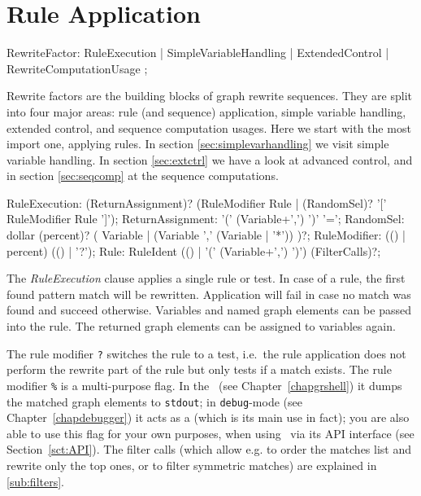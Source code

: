 \section{Rule Application} \label{sec:ruleapplication}

\begin{rail} 
  RewriteFactor: RuleExecution
     | SimpleVariableHandling
     | ExtendedControl
     | RewriteComputationUsage
	; 
\end{rail}

Rewrite factors are the building blocks of graph rewrite sequences.
They are split into four major areas: rule (and sequence) application, simple variable handling, extended control, and sequence computation usages.
Here we start with the most import one, applying rules.
In section \ref{sec:simplevarhandling} we visit simple variable handling.
In section \ref{sec:extctrl} we have a look at advanced control, and in section \ref{sec:seqcomp} at the sequence computations.

\begin{rail}
  RuleExecution: (ReturnAssignment)? (RuleModifier Rule | (RandomSel)? '[' RuleModifier Rule ']');
  ReturnAssignment: '(' (Variable+',') ')' '=';
  RandomSel: dollar (percent)? ( Variable | (Variable ',' (Variable | '*')) )?;
  RuleModifier: (() | percent) (() | '?');
  Rule: RuleIdent (() | '(' (Variable+',') ')') (FilterCalls)?;
\end{rail}

The \emph{RuleExecution} clause applies a single rule or test.
In case of a rule, the first found pattern match will be rewritten.
Application will fail in case no match was found and succeed otherwise. 
Variables and named graph elements can be passed into the rule.
The returned graph elements can be assigned to variables again.

The rule modifier \texttt{?} switches the rule to a test, i.e.\ the rule application does not perform the rewrite part of the rule but only tests if a match exists.
The rule modifier \texttt{\%} is a multi-purpose flag. 
In the \GrShell\ (see Chapter~\ref{chapgrshell}) it dumps the matched graph elements to \texttt{stdout};
in \texttt{debug}-mode (see Chapter~\ref{chapdebugger}) it acts as a  (which is its main use in fact);
you are also able to use this flag for your own purposes, when using \GrG\ via its API interface (see Section~\ref{sct:API}).
The filter calls (which allow e.g. to order the matches list and rewrite only the top ones, or to filter symmetric matches) are explained in \ref{sub:filters}.

